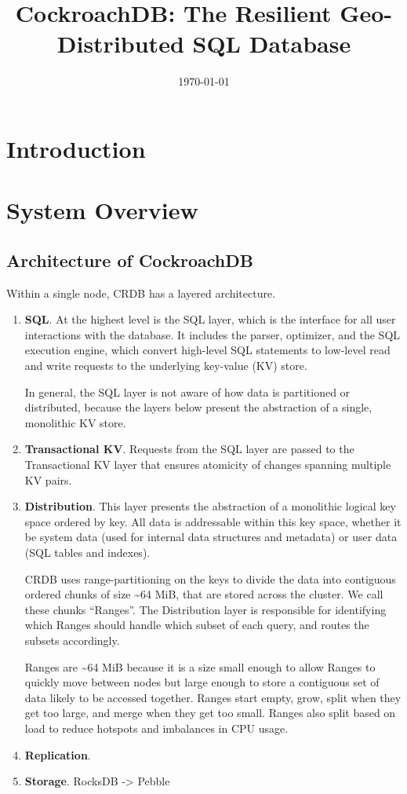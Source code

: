 \documentclass[11pt]{article}
\date{\today}
\title{CockroachDB: The Resilient Geo-Distributed SQL Database}
\begin{document}
\maketitle
\section{Introduction}
\label{sec:org857f4b8}

\section{System Overview}
\label{sec:orgfee528e}

\subsection{Architecture of CockroachDB}
\label{sec:org159b5d2}
Within a single node, CRDB has a layered architecture.
\begin{enumerate}
\item \textbf{SQL}. At the highest level is the SQL layer, which is the interface for all user interactions with
the database. It includes the parser, optimizer, and the SQL execution engine, which convert
high-level SQL statements to low-level read and write requests to the underlying key-value (KV)
store.

In general, the SQL layer is not aware of how data is partitioned or distributed, because the
layers below present the abstraction of a single, monolithic KV store.
\item \textbf{Transactional KV}. Requests from the SQL layer are passed to the Transactional KV layer that ensures
atomicity of changes spanning multiple KV pairs.
\item \textbf{Distribution}. This layer presents the abstraction of a monolithic logical key space ordered by key.
All data is addressable within this key space, whether it be system data (used for internal data
structures and metadata) or user data (SQL tables and indexes).

CRDB uses range-partitioning on the keys to divide the data into contiguous ordered chunks of size
\textasciitilde{}64 MiB, that are stored across the cluster. We call these chunks ``Ranges''. The Distribution layer
is responsible for identifying which Ranges should handle which subset of each query, and routes
the subsets accordingly.

Ranges are \textasciitilde{}64 MiB because it is a size small enough to allow Ranges to quickly move between nodes
but large enough to store a contiguous set of data likely to be accessed together. Ranges start
empty, grow, split when they get too large, and merge when they get too small. Ranges also split
based on load to reduce hotspots and imbalances in CPU usage.
\item \textbf{Replication}.
\item \textbf{Storage}. RocksDB -> Pebble
\end{enumerate}
\end{document}
